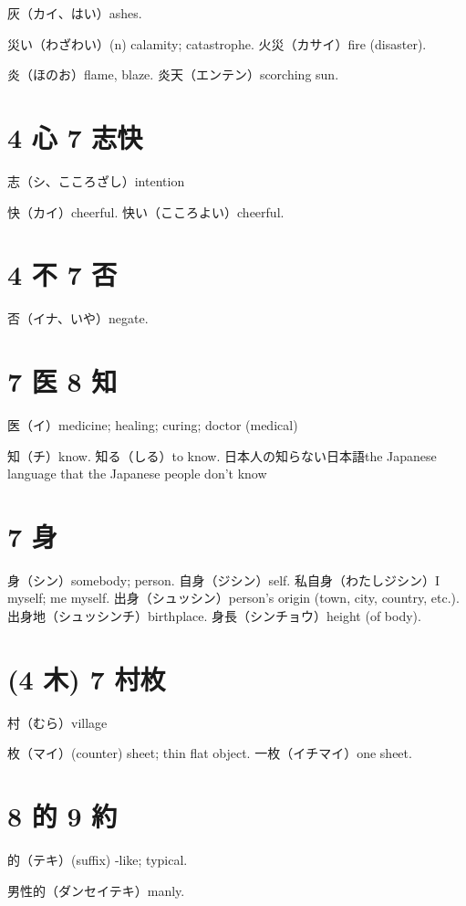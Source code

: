 灰（カイ、はい）ashes.

災い（わざわい）(n) calamity; catastrophe.
火災（カサイ）fire (disaster).

炎（ほのお）flame, blaze.
炎天（エンテン）scorching sun.

\section{4 心 7 志快}

志（シ、こころざし）intention

快（カイ）cheerful.
快い（こころよい）cheerful.

\section{4 不 7 否}

否（イナ、いや）negate.

\section{7 医 8 知}

医（イ）medicine; healing; curing; doctor (medical)

知（チ）know.
知る（しる）to know.
日本人の知らない日本語the Japanese language that the Japanese people don't know

\section{7 身}

身（シン）somebody; person.
自身（ジシン）self.
私自身（わたしジシン）I myself; me myself.
出身（シュッシン）person's origin (town, city, country, etc.).
出身地（シュッシンチ）birthplace.
身長（シンチョウ）height (of body).

\section{(4 木) 7 村枚}

村（むら）village

枚（マイ）(counter) sheet; thin flat object.
一枚（イチマイ）one sheet.

\section{8 的 9 約}

的（テキ）(suffix) -like; typical.

男性的（ダンセイテキ）manly.

